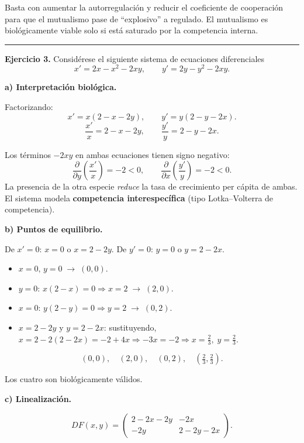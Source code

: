 \documentclass[12pt,letterpaper]{article}
\begin{document}
Basta con aumentar la autorregulación y reducir el coeficiente de cooperación para que el mutualismo pase de ``explosivo'' a regulado. El mutualismo es biológicamente viable solo si está saturado por la competencia interna.

\bigskip
\noindent\rule{\textwidth}{0.3pt}
\bigskip

\noindent\textbf{Ejercicio 3.} Considérese el siguiente sistema de ecuaciones diferenciales
\[
  x' = 2x - x^2 - 2xy, \qquad y' = 2y - y^2 - 2xy.
\]

\noindent\textbf{a) Interpretación biológica.}

Factorizando:
\[
  x' = x(2-x-2y), \qquad y' = y(2-y-2x).
\]
\[
  \frac{x'}{x} = 2-x-2y, \qquad \frac{y'}{y} = 2-y-2x.
\]

Los términos $-2xy$ en ambas ecuaciones tienen signo negativo:
\[
  \frac{\partial}{\partial y}\!\left(\frac{x'}{x}\right)=-2<0,
  \qquad
  \frac{\partial}{\partial x}\!\left(\frac{y'}{y}\right)=-2<0.
\]
La presencia de la otra especie \emph{reduce} la tasa de crecimiento per cápita de ambas.
El sistema modela \textbf{competencia interespecífica} (tipo Lotka--Volterra de competencia).

\bigskip
\noindent\textbf{b) Puntos de equilibrio.}

De $x'=0$: $x=0$ o $x = 2-2y$.
De $y'=0$: $y=0$ o $y = 2-2x$.

\begin{itemize}
  \item $x=0,\,y=0 \;\to\; (0,0)$.
  \item $y=0$: $x(2-x)=0 \Rightarrow x=2 \;\to\; (2,0)$.
  \item $x=0$: $y(2-y)=0 \Rightarrow y=2 \;\to\; (0,2)$.
  \item $x=2-2y$ y $y=2-2x$: sustituyendo,
    $x = 2-2(2-2x) = -2+4x \Rightarrow -3x=-2 \Rightarrow x=\tfrac{2}{3},\;y=\tfrac{2}{3}$.
\end{itemize}

\[
  \boxed{(0,0),\quad (2,0),\quad (0,2),\quad \left(\tfrac{2}{3},\tfrac{2}{3}\right).}
\]

Los cuatro son biológicamente válidos.

\bigskip
\noindent\textbf{c) Linealización.}

\[
  DF(x,y) = \begin{pmatrix} 2-2x-2y & -2x \\ -2y & 2-2y-2x \end{pmatrix}.
\]
\end{document}

